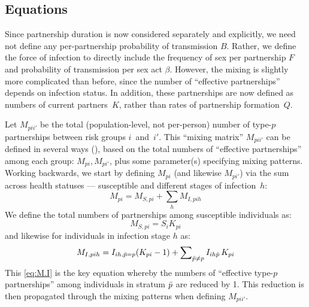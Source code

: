 \subsection{Equations}\label{foi.prop.eq}
Since partnership duration is now considered separately and explicitly,
we need not define any per-partnership probability of transmission $B$.
Rather, we define the force of infection to directly include
the frequency of sex per partnership $F$ and probability of transmission per sex act $\beta$.
However, the mixing is slightly more complicated than before,
since the number of ``effective partnerships'' depends on infection status.
In addition, these partnerships are now defined as numbers of current partners~$K$,
rather than rates of partnership formation~$Q$.
\par
Let $M_{pii'}$ be the total (population-level, not per-person)
number of type-$p$ partnerships between risk groups $i$~and~$i'$.
This ``mixing matrix'' $M_{pii'}$ can be defined in several ways (\eg {}),
based on the total numbers of ``effective partnerships'' among each group: $M_{pi}, M_{pi'}$,
plus some parameter(s) specifying mixing patterns.
Working backwards, we start by defining $M_{pi}$ (and likewise $M_{pi'}$) via
the sum across health statuses --- \ie susceptible and different stages of infection~$h$:
\begin{equation}\label{eq:M.SI}
  M_{pi} = M_{S,pi} + \sum_h M_{I,pih}
\end{equation}
We define the total numbers of partnerships among susceptible individuals as:
\begin{equation}\label{eq:M.S}
  M_{S,pi} = S_{i} K_{pi}
\end{equation}
and likewise for individuals in infection stage $h$ as:
\begin{equation}\label{eq:M.I}
  M_{I,pih} = I_{ih,\bar{p}=p} (K_{pi}-1) + \sum\nolimits_{\bar{p} \ne p} I_{ih\bar{p}}\,K_{pi}
\end{equation}
This \eqref{eq:M.I} is the key equation whereby
the  numbers of ``effective type-$p$ partnerships'' among
individuals in stratum $\bar{p}$ are reduced by 1.
This reduction is then propagated through the mixing patterns when defining $M_{pii'}$.
